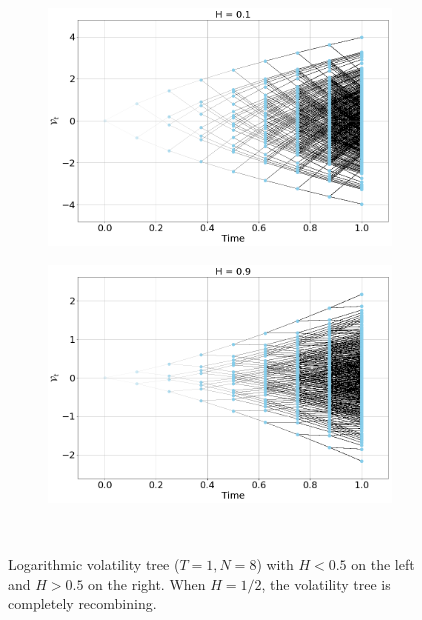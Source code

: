 \documentclass[12pt]{article}
\numberwithin{equation}{section}
\begin{document}
\begin{figure}[htb!]
\begin{center}
  \begin{subfigure}{0.5\textwidth}
    \centering
    \includegraphics[width=1.0\textwidth]{vol_tree_H01}
    \label{fig:1}
  \end{subfigure}%
  \begin{subfigure}{0.5\textwidth}
    \centering
    \includegraphics[width=1.0\textwidth]{vol_tree_H09}
    \label{fig:2}
  \end{subfigure}\\
\caption{Logarithmic volatility tree ($T=1, N=8$) with $H<0.5$ on the left and $H>0.5$ on the right. When $H=1/2$, the volatility tree is completely recombining.}
\label{fig:voltree}
\end{center}
\end{figure}
\end{document}
